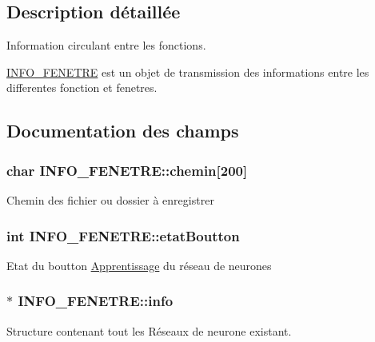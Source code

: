 \subsection{Description détaillée}
Information circulant entre les fonctions. 

\hyperlink{structINFO__FENETRE}{I\+N\+F\+O\+\_\+\+F\+E\+N\+E\+T\+RE} est un objet de transmission des informations entre les differentes fonction et fenetres. 

\subsection{Documentation des champs}
\subsubsection[{\texorpdfstring{chemin}{chemin}}]{\setlength{\rightskip}{0pt plus 5cm}char I\+N\+F\+O\+\_\+\+F\+E\+N\+E\+T\+R\+E\+::chemin\mbox{[}200\mbox{]}}\hypertarget{structINFO__FENETRE_a45ef7a5a1039c09dcb82975b4a070c21}{}\label{structINFO__FENETRE_a45ef7a5a1039c09dcb82975b4a070c21}
Chemin des fichier ou dossier à enregistrer 
\subsubsection[{\texorpdfstring{etat\+Boutton}{etatBoutton}}]{\setlength{\rightskip}{0pt plus 5cm}int I\+N\+F\+O\+\_\+\+F\+E\+N\+E\+T\+R\+E\+::etat\+Boutton}\hypertarget{structINFO__FENETRE_ac0a8053617f09b84823e045c847bfdd6}{}\label{structINFO__FENETRE_ac0a8053617f09b84823e045c847bfdd6}
Etat du boutton \hyperlink{structApprentissage}{Apprentissage} du réseau de neurones 
\subsubsection[{\texorpdfstring{info}{info}}]{$\ast$ I\+N\+F\+O\+\_\+\+F\+E\+N\+E\+T\+R\+E\+::info}\hypertarget{structINFO__FENETRE_a11f9a61d9418b5b167ac2c2dbfa99dac}{}\label{structINFO__FENETRE_a11f9a61d9418b5b167ac2c2dbfa99dac}
Structure contenant tout les Réseaux de neurone existant. 
